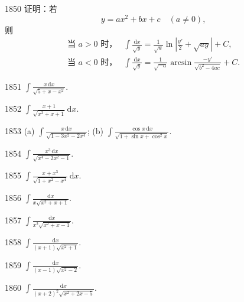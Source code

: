 \begin{prob}[M]{1850}
证明：若
\[
y = ax^2 + bx + c \quad (a \neq 0),
\]
则
\begin{align*}
\text{当 } a > 0 \text{ 时，} & \int \frac{\mathrm{d}x}{\sqrt{y}} = \frac{1}{\sqrt{a}} \ln\left|\frac{y'}{2} + \sqrt{ay}\right| + C, \\
\text{当 } a < 0 \text{ 时，} & \int \frac{\mathrm{d}x}{\sqrt{y}} = \frac{1}{\sqrt{-a}} \arcsin \frac{-y'}{\sqrt{b^2 - 4ac}} + C.
\end{align*}
\end{prob}

\begin{prob}[S]{1851}
$\int \frac{x\,\mathrm{d}x}{\sqrt{5 + x - x^2}}$.
\end{prob}

\begin{prob}[S]{1852}
$\int \frac{x + 1}{\sqrt{x^2 + x + 1}}\,\mathrm{d}x$.
\end{prob}

\begin{prob}[M]{1853}
(a) $\int \frac{x\,\mathrm{d}x}{\sqrt{1 - 3x^2 - 2x^4}}$; \qquad (b) $\int \frac{\cos x\,\mathrm{d}x}{\sqrt{1 + \sin x + \cos^2 x}}$.
\end{prob}

\begin{prob}[S]{1854}
$\int \frac{x^3\,\mathrm{d}x}{\sqrt{x^4 - 2x^2 - 1}}$.
\end{prob}

\begin{prob}[S]{1855}
$\int \frac{x + x^3}{\sqrt{1 + x^2 - x^4}}\,\mathrm{d}x$.
\end{prob}

\begin{prob}[S]{1856}
$\int \frac{\mathrm{d}x}{x\sqrt{x^2 + x + 1}}$.
\end{prob}

\begin{prob}[S]{1857}
$\int \frac{\mathrm{d}x}{x^2\sqrt{x^2 + x - 1}}$.
\end{prob}

\begin{prob}[S]{1858}
$\int \frac{\mathrm{d}x}{(x + 1)\sqrt{x^2 + 1}}$.
\end{prob}

\begin{prob}[S]{1859}
$\int \frac{\mathrm{d}x}{(x - 1)\sqrt{x^2 - 2}}$.
\end{prob}

\begin{prob}[S]{1860}
$\int \frac{\mathrm{d}x}{(x + 2)^2 \sqrt{x^2 + 2x - 5}}$.
\end{prob}

